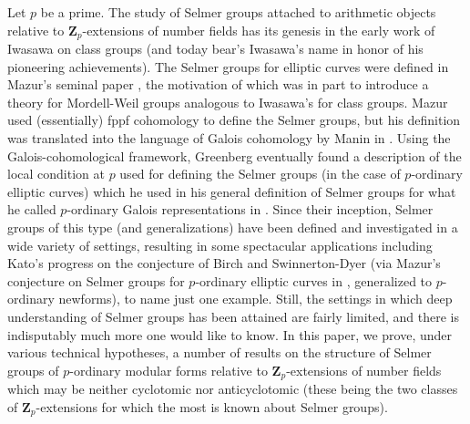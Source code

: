 \documentclass[12 pt]{amsart}
\theoremstyle{plain}
\theoremstyle{definition}
\numberwithin{equation}{section}
\numberwithin{table}{section}
\begin{document}
\indent Let $p$ be a prime. The study of Selmer groups attached to arithmetic objects relative to $\mathbf{Z}_p$-extensions of number fields has its genesis in the early work of Iwasawa on class groups (and today bear's Iwasawa's name in honor of his pioneering achievements). The Selmer groups for elliptic curves were defined in Mazur's seminal paper \cite{M}, the motivation of which was in part to introduce a theory for Mordell-Weil groups analogous to Iwasawa's for class groups. Mazur used (essentially) fppf cohomology to define the Selmer groups, but his definition was translated into the language of Galois cohomology by Manin in \cite{Man71}. Using the Galois-cohomological framework, Greenberg eventually found a description of the local condition at $p$ used for defining the Selmer groups (in the case of $p$-ordinary elliptic curves) which he used in his general definition of Selmer groups for what he called $p$-ordinary Galois representations in \cite{GR89}. Since their inception, Selmer groups of this type (and generalizations) have been defined and investigated in a wide variety of settings, resulting in some spectacular applications including Kato's progress on the conjecture of Birch and Swinnerton-Dyer (via Mazur's conjecture on Selmer groups for $p$-ordinary elliptic curves in \cite{M}, generalized to $p$-ordinary newforms), to name just one example. Still, the settings in which deep understanding of Selmer groups has been attained are fairly limited, and there is indisputably much more one would like to know. In this paper, we prove, under various technical hypotheses, a number of results on the structure of Selmer groups of $p$-ordinary modular forms relative to $\mathbf{Z}_p$-extensions of number fields which may be neither cyclotomic nor anticyclotomic (these being the two classes of $\mathbf{Z}_p$-extensions for which the most is known about Selmer groups).\\%
\end{document}
